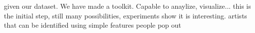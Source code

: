 given our dataset.
We have made a toolkit. Capable to anaylize, visualize...
this is the initial step, still many possibilities, experiments show it is interesting.
artists that can be identified using simple features
people pop out